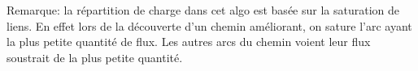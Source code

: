 \documentclass[onecolumn, 12pt]{article}
\begin{document}
Remarque: la r\'epartition de charge dans cet algo est bas\'ee sur la saturation de liens. En effet lors de la d\'ecouverte d'un chemin am\'eliorant, on sature l'arc ayant la plus petite quantit\'e de flux. Les autres arcs du chemin voient leur flux soustrait de la plus petite quantit\'e.                                                                                                                                                                                                                                                                                                                                                                                                                                                                                                                                                                                                                                                                                                                                                                                                                                                                                                                                                                                                                                                                                                                                                                                                                                                                                                                                                                                                                                                                                                                                                                                                                                                                                                                                                                                                                                                                                    
\end{document}
